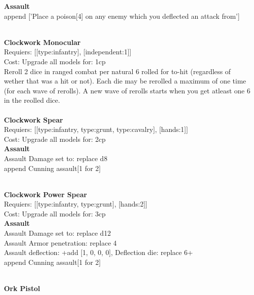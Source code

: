 {\bf Assault} \ \\

append ['Place a poison[4] on any enemy which you deflected an attack from']


\ \\
{\bf Clockwork Monocular } \\

Requiers: [[type:infantry], [independent:1]] \\
Cost: Upgrade all models for: 1cp \\
Reroll 2 dice in ranged combat per natural 6 rolled for to-hit (regardless of wether that was a hit or not). Each die may be rerolled a maximum of one time (for each wave of rerolls). A new wave of rerolls starts when you get atleast one 6 in the reolled dice.\\ 









\ \\
{\bf Clockwork Spear } \\

Requiers: [[type:infantry, type:grunt, type:cavalry], [hands:1]] \\
Cost: Upgrade all models for: 2cp \\




{\bf Assault} \ \\
Assault Damage set to: replace d8
\\ 

append Cunning assault[1 for 2]


\ \\
{\bf Clockwork Power Spear } \\

Requiers: [[type:infantry, type:grunt], [hands:2]] \\
Cost: Upgrade all models for: 3cp \\




{\bf Assault} \ \\
Assault Damage set to: replace d12
\\ 
Assault Armor penetration: replace 4 
\\ 
Assault deflection: +add [1, 0, 0, 0], Deflection die: replace 6+
\\ 

append Cunning assault[1 for 2]


\ \\
{\bf Ork Pistol } \\

